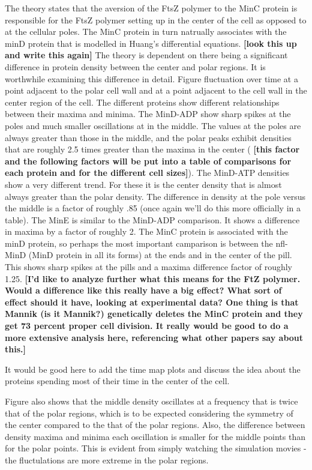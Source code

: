 \documentclass[letterpaper,twocolumn,amsmath,amssymb,pre]{revtex4-1}
\newcommand{\red}[1]{{\bf \color{red} #1}}
\newcommand{\fixme}[1]{\red{[#1]}}
\begin{document}
The theory states that the aversion of the FtsZ polymer to the MinC
protein is responsible for the FtsZ polymer setting up in the center
of the cell as opposed to at the cellular poles.  The MinC protein in
turn natrually associates with the minD protein that is modelled in
Huang's differential equations.  \fixme{look this up and write this
  again} The theory is dependent on there being a significant
difference in protein density between the center and polar regions. It
is worthwhile examining this difference in detail.  Figure
fluctuation over time at a point adjacent to the polar cell wall and
at a point adjacent to the cell wall in the center region of the cell.
The different proteins show different relationships between their
maxima and minima.  The MinD-ADP show sharp spikes at the poles and
much smaller oscillations at in the middle.  The values at the poles
are always greater than those in the middle, and the polar peaks
exhibit densities that are roughly 2.5 times greater than the maxima
in the center (\fixme{this factor and the following factors will be put
  into a table of comparisons for each protein and for the different
  cell sizes}).  The MinD-ATP densities show a very different trend.
For these it is the center density that is almost always greater than
the polar density.  The difference in density at the pole versus the
middle is a factor of roughly .85 (once again we'll do this more
officially in a table).  The MinE is similar to the MinD-ADP
comparison.  It shows a difference in maxima by a factor of roughly 2.
The MinC protein is associated with the minD protein, so perhaps the
most important camparison is between the nfl-MinD (MinD protein in all
its forms) at the ends and in the center of the pill.  This shows
sharp spikes at the pills and a maxima difference factor of roughly
1.25. \fixme{I'd like to analyze further what this means for the FtZ
  polymer.  Would a difference like this really have a big effect?
  What sort of effect should it have, looking at experimental data?
  One thing is that Mannik (is it Mannik?) genetically deletes the
  MinC protein and they get 73 percent proper cell division.  It
  really would be good to do a more extensive analysis here,
  referencing what other papers say about this.}

It would be good here to add the time map plots and discuss the idea
about the proteins spending most of their time in the center of the
cell.

Figure also shows that the middle
density oscillates at a frequency that is twice that of the polar
regions, which is to be expected considering the symmetry of the
center compared to the that of the polar regions.  Also, the
difference between density maxima and minima each oscillation is
smaller for the middle points than for the polar points.  This is
evident from simply watching the simulation movies - the fluctulations
are more extreme in the polar regions.
\end{document}
